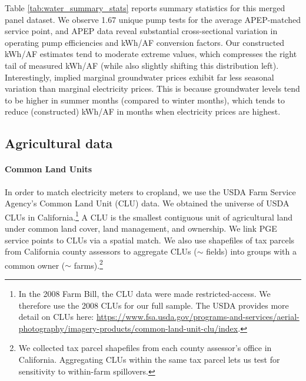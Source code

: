 Table \ref{tab:water_summary_stats} reports summary statistics for this merged panel dataset. We observe 1.67 unique pump tests for the average APEP-matched service point, and APEP data reveal substantial cross-sectional variation in operating pump efficiencies and kWh/AF conversion factors. Our constructed  kWh/AF estimates tend to moderate extreme values, which compresses the right tail of measured kWh/AF (while also slightly shifting this distribution left). Interestingly, implied marginal groundwater prices exhibit far less seasonal variation than marginal electricity prices. This is because groundwater levels tend to be higher in summer months (compared to winter months), which tends to reduce (constructed) kWh/AF in months when electricity prices are highest.




\subsection{Agricultural data}
\paragraph{Common Land Units} 
In order to match electricity meters to cropland, we use the USDA Farm Service Agency's Common Land Unit (CLU) data. We obtained the universe of USDA CLUs in California.\footnote{In the 2008 Farm Bill, the CLU data were made restricted-access. We therefore use the 2008 CLUs for our full sample. The USDA provides more detail on CLUs here: \url{https://www.fsa.usda.gov/programs-and-services/aerial-photography/imagery-products/common-land-unit-clu/index}.} A CLU is the smallest contiguous unit of agricultural land under common land cover, land management, and ownership. We link PGE service points to CLUs via a spatial match. We also use shapefiles of tax parcels from California county assessors to aggregate CLUs ($\sim$ fields) into groups with a common owner ($\sim$ farms).\footnote{We collected tax parcel shapefiles from each county assessor's office in California. Aggregating CLUs within the same tax parcel lets us test for sensitivity to within-farm spillovers.} 

